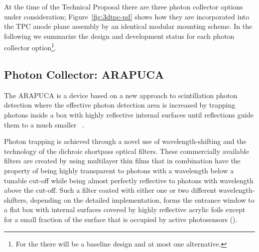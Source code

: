 
At the time of the Technical Proposal there are three photon collector options under consideration; Figure~\ref{fig:3dtpc-pd} shows how they are incorporated into the TPC anode plane assembly by an identical modular mounting scheme. In the following we summarize the design and development status for each photon collector option\footnote{For the  there will be a baseline design and at most one alternative.}.



\subsection{Photon Collector: ARAPUCA}
\label{ssec:fdsp-pd-pc-arapuca}

The ARAPUCA is a device based on a new approach to \lar scintillation photon detection where the effective photon detection area is increased by trapping photons inside a box with highly reflective internal surfaces until reflections guide them to a much smaller ~\cite{arapuca_jinst}. 

Photon trapping is achieved through a novel use of wavelength-shifting and the technology of the dichroic shortpass optical filters. These commercially available filters are created by using multilayer thin films that in combination have the property of being highly transparent to photons with a wavelength below a tunable cut-off while being almost perfectly reflective to photons with wavelength above the cut-off.  Such a filter coated with either one or two different wavelength-shifters, depending on the detailed implementation,  forms the entrance window to a flat box with internal surfaces covered by highly reflective acrylic foils
except for a small fraction of the surface that is occupied by active photosensors ().

